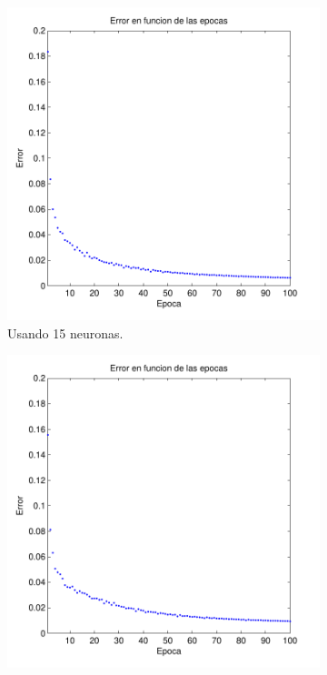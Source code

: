 \documentclass[informe.tex]{subfiles}
\begin{document}
    \begin{figure}[H]
        \centering
        \begin{subfigure}[b]{0.32\textwidth}
                \includegraphics[width=\textwidth]{graficos/error_fold1_15_binary_100_05.pdf}
                \caption{Usando 15 neuronas.}
                \label{fig:d1-f1-05-n15}
        \end{subfigure}
        \begin{subfigure}[b]{0.32\textwidth}
                \includegraphics[width=\textwidth]{graficos/error_fold1_20_binary_100_05.pdf}

\end{subfigure}
\end{figure}
\end{document}
